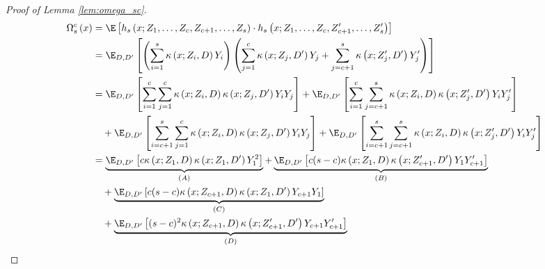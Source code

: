 \begin{proof}[Proof of Lemma \ref{lem:omega_sc}]
	\begin{equation}
		\begin{aligned}
			\Omega_{s}^{c}\left(x\right)
			 & = \E\left[h_{s}\left(x; Z_1, \ldots, Z_{c}, Z_{c+1}, \ldots, Z_{s}\right) \cdot
			h_{s}\left(x; Z_1, \ldots,Z_{c}, Z_{c+1}^{\prime}, \ldots, Z_{s}^{\prime}\right)\right]                                                                \\
			 & = \E_{D, D^{\prime}}\left[
				\left(\sum_{i = 1}^{s}\kappa\left(x; Z_{i}, D\right)Y_{i}\right)
				\left(\sum_{j = 1}^{c}\kappa\left(x; Z_{j}, D^{\prime}\right)Y_{j}
				+ \sum_{j = c+1}^{s}\kappa\left(x; Z_{j}^{\prime}, D^{\prime}\right)Y_{j}^{\prime}\right)
			\right]                                                                                                                                                                                             \\
			 & = \E_{D, D^{\prime}}\left[\sum_{i = 1}^{c}\sum_{j = 1}^{c}\kappa\left(x; Z_{i}, D\right)\kappa\left(x; Z_{j}, D^{\prime}\right)Y_{i}Y_{j}\right]
			+  \E_{D, D^{\prime}}\left[\sum_{i = 1}^{c}\sum_{j = c+1}^{s}\kappa\left(x; Z_{i}, D\right)\kappa\left(x; Z_{j}^{\prime}, D^{\prime}\right)Y_{i}Y_{j}^{\prime}\right]   \\
			 & \quad + \E_{D, D^{\prime}}\left[\sum_{i = c+1}^{s}\sum_{j = 1}^{c}\kappa\left(x; Z_{i}, D\right)\kappa\left(x; Z_{j}, D^{\prime}\right)Y_{i}Y_{j}\right]
			+  \E_{D, D^{\prime}}\left[\sum_{i = c+1}^{s}\sum_{j = c+1}^{s}\kappa\left(x; Z_{i}, D\right)\kappa\left(x; Z_{j}^{\prime}, D^{\prime}\right)Y_{i}Y_{j}^{\prime}\right] \\
			 & = \underbrace{\E_{D, D^{\prime}}\left[c \kappa\left(x; Z_{1}, D\right)\kappa\left(x; Z_{1}, D^{\prime}\right)Y_{1}^{2}\right]}_{(A)}
			+ \underbrace{\E_{D, D^{\prime}}\left[c(s-c) \kappa\left(x; Z_{1}, D\right)\kappa\left(x; Z_{c+1}^{\prime}, D^{\prime}\right)Y_{1}Y_{c+1}^{\prime}\right]}_{(B)}                           \\
			 & \quad + \underbrace{\E_{D, D^{\prime}}\left[c(s-c) \kappa\left(x; Z_{c+1}, D\right)\kappa\left(x; Z_{1}, D^{\prime}\right)Y_{c+1}Y_{1}\right]}_{(C)}                                    \\
			 & \quad + \underbrace{\E_{D, D^{\prime}}\left[(s-c)^2 \kappa\left(x; Z_{c+1}, D\right)\kappa\left(x; Z_{c+1}^{\prime}, D^{\prime}\right)Y_{c+1}Y_{c+1}^{\prime}\right]}_{(D)}
		\end{aligned}

\end{equation}
\end{proof}
